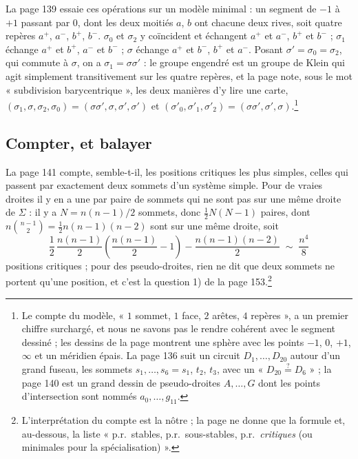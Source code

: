 \documentclass[11pt,a4paper]{article}
\begin{document}
La page 139 essaie ces opérations sur un modèle minimal : un segment de $-1$ à
$+1$ passant par $0$, dont les deux moitiés $a$, $b$ ont chacune deux rives, soit
quatre repères $a^{+}$, $a^{-}$, $b^{+}$, $b^{-}$. $\sigma_0$ et $\sigma_2$ y
coïncident et échangent $a^{+}$ et $a^{-}$, $b^{+}$ et $b^{-}$ ; $\sigma_1$
échange $a^{+}$ et $b^{+}$, $a^{-}$ et $b^{-}$ ; $\sigma$ échange $a^{+}$ et
$b^{-}$, $b^{+}$ et $a^{-}$. Posant $\sigma' = \sigma_0 = \sigma_2$, qui commute
à $\sigma$, on a $\sigma_1 = \sigma\sigma'$ : le groupe engendré est un groupe de
Klein qui agit simplement transitivement sur les quatre repères, et la page
note, sous le mot « subdivision barycentrique », les deux manières d'y lire une
carte, $(\sigma_1, \sigma, \sigma_2, \sigma_0) = (\sigma\sigma', \sigma,
\sigma', \sigma')$ et $(\sigma'_0, \sigma'_1, \sigma'_2) = (\sigma\sigma',
\sigma', \sigma)$.\footnote{Le compte du modèle, « $1$ sommet, $1$ face, $2$
arêtes, $4$ repères », a un premier chiffre surchargé, et nous ne savons pas le
rendre cohérent avec le segment dessiné ; les dessins de la page montrent une
sphère avec les points $-1$, $0$, $+1$, $\infty$ et un méridien épais. La page
136 suit un circuit $D_1, \ldots, D_{20}$ autour d'un grand fuseau, les sommets
$s_1, \ldots, s_6 = s_1$, $t_2$, $t_3$, avec un « $D_{20} \overset{?}{=} D_6$ » ;
la page 140 est un grand dessin de pseudo-droites $A, \ldots, G$ dont les points
d'intersection sont nommés $a_0, \ldots, g_{11}$.}

\subsection*{Compter, et balayer}

La page 141 compte, semble-t-il, les positions critiques les plus simples,
celles qui passent par exactement deux sommets d'un système simple. Pour de
vraies droites il y en a une par paire de sommets qui ne sont pas sur une même
droite de $\Sigma$ : il y a $N = n(n-1)/2$ sommets, donc $\frac12 N(N-1)$
paires, dont $n \binom{n-1}{2} = \frac12 n(n-1)(n-2)$ sont sur une même droite,
soit
\[
\frac{1}{2}\,\frac{n(n-1)}{2}\left(\frac{n(n-1)}{2} - 1\right) -
\frac{n(n-1)(n-2)}{2} \;\sim\; \frac{n^4}{8}
\]
positions critiques ; pour des pseudo-droites, rien ne dit que deux sommets ne
portent qu'une position, et c'est la question 1) de la page 153.\footnote{L'interprétation du compte est la nôtre ; la page
ne donne que la formule et, au-dessous, la liste « p.r.\ stables, p.r.\
sous-stables, p.r.\ \emph{critiques} (ou minimales pour la spécialisation) ».}
\end{document}
